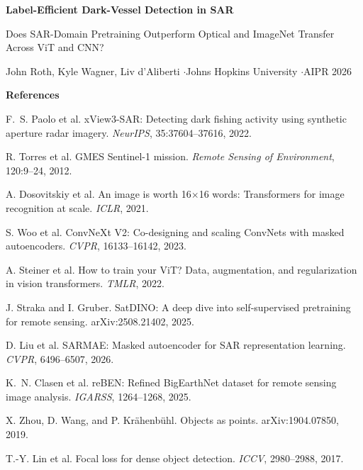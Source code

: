 \documentclass[11pt]{article}
\begin{document}
\raggedright
{\color{navy}\Large\bfseries Label-Efficient Dark-Vessel Detection in SAR\par}
\vspace{2pt}
{\large Does SAR-Domain Pretraining Outperform Optical and ImageNet Transfer
Across ViT and CNN?\par}
\vspace{6pt}
John Roth, Kyle Wagner, Liv d'Aliberti \quad$\cdot$\quad Johns Hopkins University
\quad$\cdot$\quad AIPR 2026\par
\vspace{14pt}
{\color{navy}\large\bfseries References\par}
\vspace{4pt}
\begin{enumerate}[label={[\arabic*]},leftmargin=2.4em,labelsep=0.6em,itemsep=4pt]
  \item F.~S. Paolo et al. xView3-SAR: Detecting dark fishing activity using
    synthetic aperture radar imagery. \emph{NeurIPS}, 35:37604--37616, 2022.
  \item R. Torres et al. GMES Sentinel-1 mission. \emph{Remote Sensing of
    Environment}, 120:9--24, 2012.
  \item A. Dosovitskiy et al. An image is worth 16$\times$16 words:
    Transformers for image recognition at scale. \emph{ICLR}, 2021.
  \item S. Woo et al. ConvNeXt V2: Co-designing and scaling ConvNets with
    masked autoencoders. \emph{CVPR}, 16133--16142, 2023.
  \item A. Steiner et al. How to train your ViT? Data, augmentation, and
    regularization in vision transformers. \emph{TMLR}, 2022.
  \item J. Straka and I. Gruber. SatDINO: A deep dive into self-supervised
    pretraining for remote sensing. arXiv:2508.21402, 2025.
  \item D. Liu et al. SARMAE: Masked autoencoder for SAR representation
    learning. \emph{CVPR}, 6496--6507, 2026.
  \item K.~N. Clasen et al. reBEN: Refined BigEarthNet dataset for remote
    sensing image analysis. \emph{IGARSS}, 1264--1268, 2025.
  \item X. Zhou, D. Wang, and P. Kr\"ahenb\"uhl. Objects as points.
    arXiv:1904.07850, 2019.
  \item T.-Y. Lin et al. Focal loss for dense object detection. \emph{ICCV}, 2980--2988, 2017.
\end{enumerate}
\end{document}
